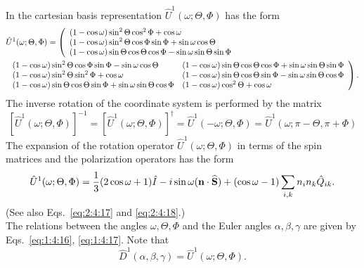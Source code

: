 In the cartesian basis representation $\hat{U}^{1}(\omega ; \Theta, \Phi)$ has the form
\begin{align}
& \hat{U}^{1}(\omega ; \Theta, \Phi)=\left(\begin{array}{l}
(1-\cos \omega) \sin ^{2} \Theta \cos ^{2} \Phi+\cos \omega \\
(1-\cos \omega) \sin ^{2} \Theta \cos \Phi \sin \Phi+\sin \omega \cos \Theta \\
(1-\cos \omega) \sin \Theta \cos \Theta \cos \Phi-\sin \omega \sin \Theta \sin \Phi
\end{array}\right.  \notag\\
& \left.\begin{array}{ll}
(1-\cos \omega) \sin ^{2} \Theta \cos \Phi \sin \Phi-\sin \omega \cos \Theta & (1-\cos \omega) \sin \Theta \cos \Theta \cos \Phi+\sin \omega \sin \Theta \sin \Phi \\
(1-\cos \omega) \sin ^{2} \Theta \sin ^{2} \Phi+\cos \omega & (1-\cos \omega) \sin \Theta \cos \Theta \sin \Phi-\sin \omega \sin \Theta \cos \Phi \\
(1-\cos \omega) \sin \Theta \cos \Theta \sin \Phi+\sin \omega \sin \Theta \cos \Phi & (1-\cos \omega) \cos ^{2} \Theta+\cos \omega
\end{array}\right) . \label{eq:2:6:81}
\end{align}
The inverse rotation of the coordinate system is performed by the matrix
\begin{equation}
\left[\hat{U}^{1}(\omega ; \Theta, \Phi)\right]^{-1}=\left[\hat{U}^{1}(\omega ; \Theta, \Phi)\right]^{\dagger}=\hat{U}^{1}(-\omega ; \Theta, \Phi)=\hat{U}^{1}(\omega ; \pi-\Theta, \pi+\Phi) \label{eq:2:6:82}
\end{equation}
The expansion of the rotation operator $\hat{U}^{1}(\omega ; \Theta, \Phi)$ in terms of the spin matrices and the polarization operators has the form
\begin{equation}
\hat{U}^{1}(\omega ; \Theta, \Phi)=\frac{1}{3}(2 \cos \omega+1) \hat{I}-i \sin \omega(\mathbf{n} \cdot \widehat{\mathbf{S}})+(\cos \omega-1) \sum_{i, k} n_{i} n_{k} \hat{Q}_{i k} .\label{eq:2:6:83}
\end{equation}
(See also Eqs.~\eqref{eq:2:4:17} and \eqref{eq:2:4:18}.)\\
The relations between the angles $\omega, \Theta, \Phi$ and the Euler angles $\alpha, \beta, \gamma$ are given by Eqs.~\eqref{eq:1:4:16}, \eqref{eq:1:4:17}. Note that
\begin{equation}
\widehat{D}^{1}(\alpha, \beta, \gamma)=\widehat{U}^{1}(\omega ; \Theta, \Phi) .\label{eq:2:6:84}
\end{equation}
